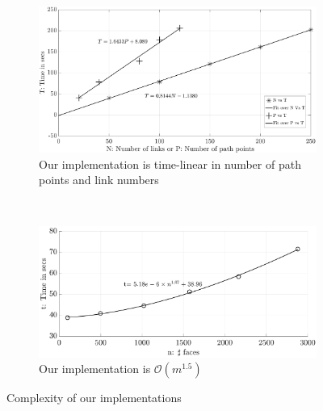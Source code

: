 \documentclass[12pt,a4]{article}
\begin{document}
 \begin{figure}
\centering
\begin{subfigure}{0.75\textwidth}
\centering
 \includegraphics[width=0.8\linewidth]{figures/Path_and_link_complexity.pdf}
\caption{Our implementation is time-linear in number of path points and link numbers}
\label{fig:path_complexity}
\end{subfigure}%
\\
\begin{subfigure}{0.8\textwidth}
\centering
 \includegraphics[width=0.8\linewidth]{figures/face_complexity.pdf}
\caption{Our implementation is $\mathcal{O}(m^{1.5})$}
\label{fig:face_complexity}
\end{subfigure}%
\caption{ Complexity of our implementations}
\label{fig:complexity}
\end{figure}
 
\end{document}
